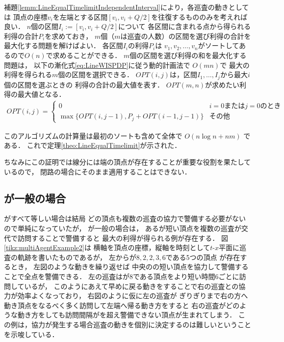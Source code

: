 補題\ref{lemm:LineEqualTimelimitIndependentInterval}により，各巡査の動きとしては
頂点の座標$v_i$を左端とする区間$[v_i, v_i + Q/2]$を往復するもののみを考えれば良い．
$n$個の区間$I_i := [v_i, v_i + Q/2]$について
各区間に含まれる点から得られる利得の合計$P_i$を求めておき，
$m$個（$m$は巡査の人数）の区間を選び利得の合計を最大化する問題を解けばよい．
%
各区間$I_i$の利得$P_i$は
$v_1,v_2,\ldots,v_n$がソートしてあるので$O(n)$で求めることができる．
%
$m$個の区間を選び利得の和を最大化する問題は，
以下の漸化式\ref{eq:LineWISPDP}に従う動的計画法で
$O(mn)$で
最大の利得を得られる$m$個の区間を選択できる．
$OPT(i,j)$は，区間$I_1, \ldots, I_j$から最大$i$個の区間を選ぶときの
利得の合計の最大値を表す．
$OPT(m,n)$が求めたい利得の最大値となる．
\begin{align}
	\label{eq:LineWISPDP}
	OPT(i,j) = 
	\begin{cases}
		0 & \text{$i = 0$または$j = 0$のとき} \\
		\max \{
			OPT(i, j - 1), 
			P_j + OPT(i - 1, j - 1)
		\}
		& \text{その他}
	\end{cases}
\end{align}

このアルゴリズムの計算量は最初のソートも含めて全体で $O(n \log n + nm)$ である．
これで定理\ref{theo:LineEqualTimelimit}が示された．



ちなみにこの証明では線分には端の頂点が存在することが重要な役割を果たしているので，
閉路の場合にそのまま適用することはできない．





\subsection{{\timelimit}が一般の場合}
\label{subsec:LineDifferentTimelimit}

{\timelimit}がすべて等しい場合は結局
どの頂点も複数の巡査の協力で警備する必要がないので単純になっていたが，
%
{\timelimit}が一般の場合は，
ある{\timelimit}が短い頂点を複数の巡査が交代で訪問することで警備すると
最大の利得が得られる例が存在する．
%
図\ref{tikz:multiAgentExample2}は
横軸を頂点の座標，縦軸を時刻として$t$-$x$平面に巡査の軌跡を書いたものであるが，
%
左から{\timelimit}が$8,2,2,3,6$である5つの頂点
が存在するとき，
左図のような動きを繰り返せば
中央の{\timelimit}の短い頂点を協力して警備することで全点を警備できる．
左の巡査は{\timelimit}が$8$である頂点をより短い時間$6$ごとに訪問しているが，
このようにあえて早めに戻る動きをすることで右の巡査との協力が効率よくなっており，
右図のように仮に左の巡査が
{\timelimit}ぎりぎりまで右の方へ動き頂点をなるべく多く訪問して左端へ帰る動き方をすると
右の巡査がどのような動き方をしても訪問間隔が{\timelimit}を超え警備できない頂点が生まれてしまう．
%
この例は，協力が発生する場合巡査の動きを個別に決定するのは難しいということを示唆している．
%

